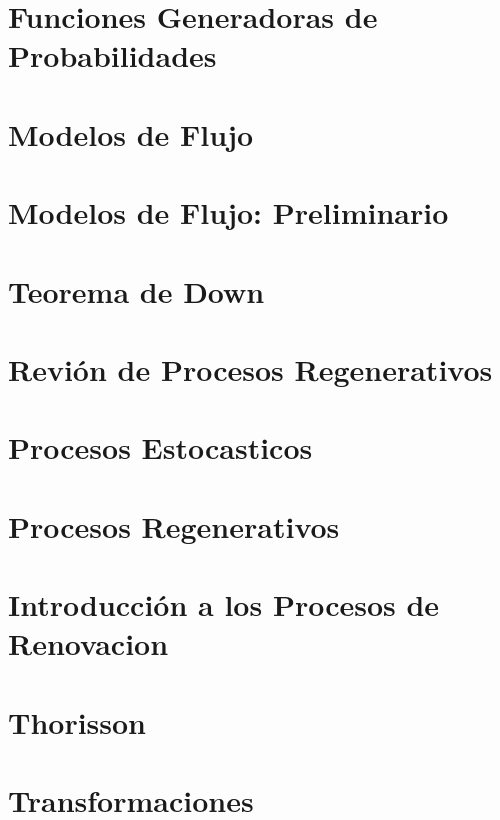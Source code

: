 \documentclass{report}
\begin{document}
\chapter{Funciones Generadoras de Probabilidades}
%

\chapter{Modelos de Flujo}
%

\chapter{Modelos de Flujo: Preliminario}
%

\chapter{Teorema de Down}
%


\chapter{Revi\'on de Procesos Regenerativos}
%


\chapter{Procesos Estocasticos}
%

\chapter{Procesos Regenerativos}
%

\chapter{Introducción a los Procesos de Renovacion}
%


\chapter{Thorisson}
%



\chapter{Transformaciones}
%
\end{document}
